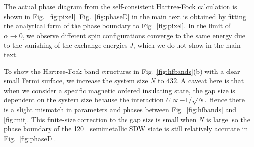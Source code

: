 \documentclass[%
 reprint,
 superscriptaddress,
 amsmath,amssymb,
 aps,
 prx,
 floatfix,
]{revtex4-2}
\newcommand{\<}{\langle}
\renewcommand{\>}{\rangle}
\renewcommand{\(}{\left(}
\renewcommand{\)}{\right)}
\renewcommand{\[}{\left[}
\renewcommand{\]}{\right]}
\DeclareMathOperator{\degree}{^{\circ}}
\begin{document}
The actual phase diagram from the self-consistent Hartree-Fock calculation is shown in Fig.~\ref{fig:pixel}. Fig.~\ref{fig:phaseD} in the main text is obtained by fitting the analytical form of the phase boundary to Fig.~\ref{fig:pixel}. In the limit of $\alpha\rightarrow 0$, we observe different spin configurations converge to the same energy due to the vanishing of the exchange energies $J$, which we do not show in the main text. 

To show the Hartree-Fock band structures in Fig.~\ref{fig:hfbands}(b) with a clear small Fermi surface, we increase the system size $N$ to $432$. A caveat here is that when we consider a specific magnetic ordered insulating state, the gap size is dependent on the system size because the interaction $U\propto -1/\sqrt{N}$. Hence there is a slight mismatch in parameters and phases between Fig.~\ref{fig:hfbands} and \ref{fig:mit}. This finite-size correction to the gap size is small when $N$ is large, so the phase boundary of the 120$\degree$ semimetallic SDW state is still relatively accurate in Fig.~\ref{fig:phaseD}.  
\end{document}
